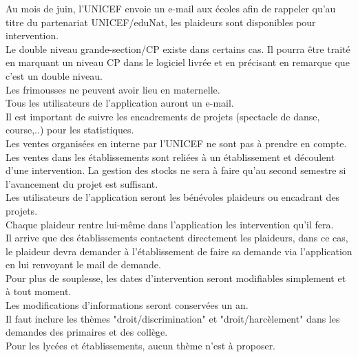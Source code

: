 \documentclass [a4paper] {article}
\begin{document}
Au mois de juin, l'UNICEF envoie un e-mail aux écoles afin de rappeler qu'au titre du partenariat UNICEF/eduNat, les plaideurs sont disponibles pour intervention.
\\

Le double niveau grande-section/CP existe dans certains cas. Il pourra être traité en marquant un niveau CP dans le logiciel livrée et en précisant en remarque que c'est un double niveau.
\\

Les frimousses ne peuvent avoir lieu en maternelle.
\\

Tous les utilisateurs de l'application auront un e-mail.
\\

Il est important de suivre les encadrements de projets (spectacle de danse, course,..) pour les statistiques.
\\

Les ventes organisées en interne par l'UNICEF ne sont pas à prendre en compte. Les ventes dans les établissements sont reliées à un établissement et découlent d'une intervention. La gestion des stocks ne sera à faire qu'au second semestre si l'avancement du projet est suffisant.
\\

Les utilisateurs de l'application seront les bénévoles plaideurs ou encadrant des projets.
\\

Chaque plaideur rentre lui-même dans l'application les intervention qu'il fera.
\\

Il arrive que des établissements contactent directement les plaideurs, dans ce cas, le plaideur devra demander à l'établissement de faire sa demande via l'application en lui renvoyant le mail de demande.
\\

Pour plus de souplesse, les dates d'intervention seront modifiables simplement et à tout moment.
\\

Les modifications d'informations seront conservées un an.
\\

Il faut inclure les thèmes "droit/discrimination" et "droit/harcèlement" dans les demandes des primaires et des collège.
\\

Pour les lycées et établissements, aucun thème n'est à proposer.
\\
\end{document}
